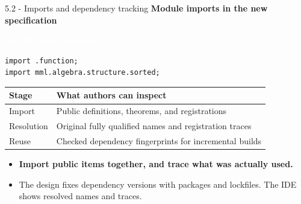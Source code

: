 \documentclass[aspectratio=169,11pt]{beamer}
\newcommand{\statusbadge}[2]{\colorbox{#1}{\textcolor{white}{\strut\scriptsize\sffamily\bfseries #2}}}
\newcommand{\badgeSpec}{\statusbadge{green!35!black}{specification example}}
\begin{document}
\begin{frame}[fragile,t]{5.2 - Imports and dependency tracking}
\smallskip
\textbf{Module imports in the new specification}~\badgeSpec
\begin{lstlisting}[language={mizar},basicstyle=\ttfamily\small]
import .function;
import mml.algebra.structure.sorted;
\end{lstlisting}
\par{}
\begin{footnotesize}
\setlength{\tabcolsep}{3pt}
\renewcommand{\arraystretch}{1.15}
\begin{tabularx}{\textwidth}{l>{\raggedright\arraybackslash}X}
\toprule
\textbf{Stage} & \textbf{What authors can inspect} \\
\midrule
Import & Public definitions, theorems, and registrations \\
Resolution & Original fully qualified names and registration traces \\
Reuse & Checked dependency fingerprints for incremental builds \\
\bottomrule
\end{tabularx}
\end{footnotesize}

\begin{itemize}
\setlength{\itemsep}{1pt}
\setlength{\parsep}{0pt}
\setlength{\parskip}{0pt}
\item \textcolor{blue!55!black}{\textbf{Import public items together, and trace what was actually used.}}
\item The design fixes dependency versions with packages and lockfiles. The IDE shows resolved names and traces.
\end{itemize}
\end{frame}
\end{document}
